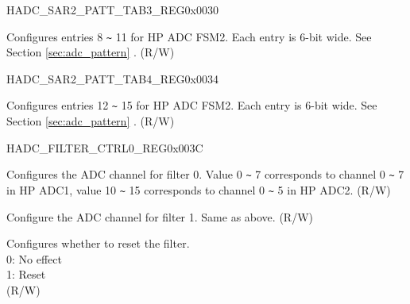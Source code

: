 \begin{register}{H}{ADC\_SAR2\_PATT\_TAB3\_REG}{0x0030}\label{regdesc:ADCSAR2PATTTAB3REG}
%
%
\regnewline%
\begin{regdesc}\begin{reglist}
\label{fielddesc:ADCSAR2PATTTAB3}\item [ADC\_SAR2\_PATT\_TAB3] Configures entries 8 \verb+~+ 11 for HP ADC FSM2. Each entry is 6-bit wide. See Section \ref{sec:adc_pattern} \textit{}. (R/W)
\end{reglist}\end{regdesc}
\end{register}


\begin{register}{H}{ADC\_SAR2\_PATT\_TAB4\_REG}{0x0034}\label{regdesc:ADCSAR2PATTTAB4REG}
%
%
\regnewline%
\begin{regdesc}\begin{reglist}
\label{fielddesc:ADCSAR2PATTTAB4}\item [ADC\_SAR2\_PATT\_TAB4] Configures entries 12 \verb+~+ 15 for HP ADC FSM2. Each entry is 6-bit wide. See Section \ref{sec:adc_pattern} \textit{}. (R/W)
\end{reglist}\end{regdesc}
\end{register}


\begin{register}{H}{ADC\_FILTER\_CTRL0\_REG}{0x003C}\label{regdesc:ADCFILTERCTRL0REG}
%
%
%
%
%
\regnewline%
\begin{regdesc}\begin{reglist}
\label{fielddesc:ADCFILTERCHANNEL1}\item [ADC\_FILTER\_CHANNEL0] Configures the ADC channel for filter 0. Value 0 \verb+~+ 7 corresponds to channel 0 \verb+~+ 7 in HP ADC1, value 10 \verb+~+ 15 corresponds to channel 0 \verb+~+ 5 in HP ADC2. (R/W)
\label{fielddesc:ADCFILTERCHANNEL0}\item [ADC\_FILTER\_CHANNEL1] Configure the ADC channel for filter 1. Same as above. (R/W)
\label{fielddesc:ADCFILTERRESET}\item [ADC\_FILTER\_RESET] Configures whether to reset the filter. \\
0: No effect\\
1: Reset\\
(R/W)
\end{reglist}\end{regdesc}
\end{register}


